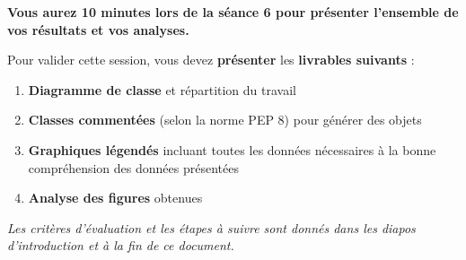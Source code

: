 
\textbf{Vous aurez 10 minutes lors de la séance 6 pour présenter l'ensemble de vos résultats et vos analyses.}

Pour valider cette session, vous devez \textbf{présenter} les \textbf{livrables suivants} :

\begin{enumerate}
\item \textbf{Diagramme de classe} et répartition du travail
\item \textbf{Classes commentées} (selon la norme PEP 8) pour générer des objets 
\item \textbf{Graphiques légendés} incluant toutes les données nécessaires à la bonne compréhension des données présentées
\item \textbf{Analyse des figures} obtenues 
\end{enumerate}

\bigskip

\textit{Les critères d'évaluation et les étapes à suivre sont donnés dans les diapos d'introduction et à la fin de ce document.}
